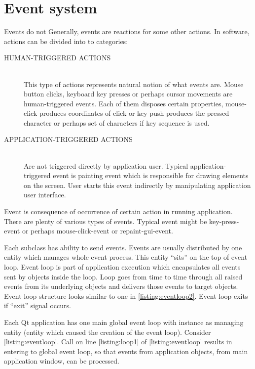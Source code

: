 \section{Event system}\label{section:events}
Events do not  Generally, events are reactions for some other actions. In software, actions can be divided into to categories:
\begin{description}
\item[HUMAN-TRIGGERED ACTIONS] \hfill \\
This type of actions represents natural notion of what events are. Mouse button clicks, keyboard key presses or perhaps cursor movements are human-triggered events. Each of them disposes certain properties, \eg mouse-click produces coordinates of click or key push produces the pressed character or perhaps set of characters if key sequence is used.
\item[APPLICATION-TRIGGERED ACTIONS]  \hfill \\
Are not triggered directly by application user. Typical application-triggered event is painting event which is responsible for drawing  elements on the screen. User starts this event indirectly by manipulating application user interface.
\end{description}

Event is consequence of occurrence of certain action in running application. There are plenty of various types of events. Typical event might be key-press-event or perhaps mouse-click-event or repaint-gui-event.

Each subclass has ability to send events. Events are usually distributed by one entity which manages whole event process. This entity \enquote{sits} on the top of event loop. Event loop is part of application execution which encapsulates all events sent by objects inside the loop. Loop goes from time to time through all raised events from its underlying objects and delivers those events to target objects. Event loop structure looks similar to one in \autoref{listing:eventloop2}. Event loop exits if \enquote{exit} signal occurs.

Each Qt application has one main global event loop with instance as managing entity (entity which caused the creation of the event loop). Consider \autoref{listing:eventloop}. Call on line \ref{listing:loop1} of \autoref{listing:eventloop} results in entering to global event loop, so that events from application objects, \eg from main application window, can be processed.


